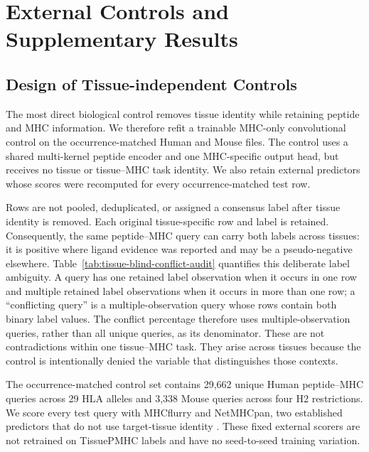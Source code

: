 \section{External Controls and Supplementary Results}

\subsection{Design of Tissue-independent Controls}

The most direct biological control removes tissue identity while retaining peptide and MHC information. We therefore refit a trainable MHC-only convolutional control on the occurrence-matched Human and Mouse files. The control uses a shared multi-kernel peptide encoder and one MHC-specific output head, but receives no tissue or tissue--MHC task identity. We also retain external predictors whose scores were recomputed for every occurrence-matched test row.

Rows are not pooled, deduplicated, or assigned a consensus label after tissue identity is removed. Each original tissue-specific row and label is retained. Consequently, the same peptide--MHC query can carry both labels across tissues: it is positive where ligand evidence was reported and may be a pseudo-negative elsewhere. Table~\ref{tab:tissue-blind-conflict-audit} quantifies this deliberate label ambiguity. A query has one retained label observation when it occurs in one row and multiple retained label observations when it occurs in more than one row; a ``conflicting query'' is a multiple-observation query whose rows contain both binary label values. The conflict percentage therefore uses multiple-observation queries, rather than all unique queries, as its denominator. These are not contradictions within one tissue--MHC task. They arise across tissues because the control is intentionally denied the variable that distinguishes those contexts.

The occurrence-matched control set contains 29,662 unique Human peptide--MHC queries across 29 HLA alleles and 3,338 Mouse queries across four H2 restrictions. We score every test query with MHCflurry and NetMHCpan, two established predictors that do not use target-tissue identity \cite{odonnell2020mhcflurry,reynisson2020netmhcpan}. These fixed external scorers are not retrained on TissuePMHC labels and have no seed-to-seed training variation.

